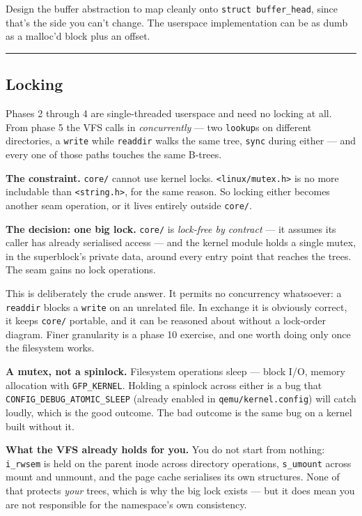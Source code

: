 Design the buffer abstraction to map cleanly onto \texttt{struct\ buffer\_head}, since that's the
side you can't change. The userspace implementation can be as dumb as a malloc'd block
plus an offset.

\begin{center}\rule{0.5\linewidth}{0.5pt}\end{center}

\hypertarget{locking}{%
\subsection{Locking}\label{locking}}

Phases 2 through 4 are single-threaded userspace and need no locking at all. From phase 5
the VFS calls in \emph{concurrently} --- two \texttt{lookup}s on different directories, a
\texttt{write} while \texttt{readdir} walks the same tree, \texttt{sync} during either --- and
every one of those paths touches the same B-trees.

\textbf{The constraint.} \texttt{core/} cannot use kernel locks. \texttt{<linux/mutex.h>} is
no more includable than \texttt{<string.h>}, for the same reason. So locking either becomes
another seam operation, or it lives entirely outside \texttt{core/}.

\textbf{The decision: one big lock.} \texttt{core/} is \emph{lock-free by contract} --- it
assumes its caller has already serialised access --- and the kernel module holds a single
mutex, in the superblock's private data, around every entry point that reaches the trees.
The seam gains no lock operations.

This is deliberately the crude answer. It permits no concurrency whatsoever: a
\texttt{readdir} blocks a \texttt{write} on an unrelated file. In exchange it is obviously
correct, it keeps \texttt{core/} portable, and it can be reasoned about without a lock-order
diagram. Finer granularity is a phase 10 exercise, and one worth doing only once the
filesystem works.

\textbf{A mutex, not a spinlock.} Filesystem operations sleep --- block I/O, memory
allocation with \texttt{GFP\_KERNEL}. Holding a spinlock across either is a bug that
\texttt{CONFIG\_DEBUG\_ATOMIC\_SLEEP} (already enabled in \texttt{qemu/kernel.config}) will
catch loudly, which is the good outcome. The bad outcome is the same bug on a kernel built
without it.

\textbf{What the VFS already holds for you.} You do not start from nothing:
\texttt{i\_rwsem} is held on the parent inode across directory operations,
\texttt{s\_umount} across mount and unmount, and the page cache serialises its own
structures. None of that protects \emph{your} trees, which is why the big lock exists ---
but it does mean you are not responsible for the namespace's own consistency.

